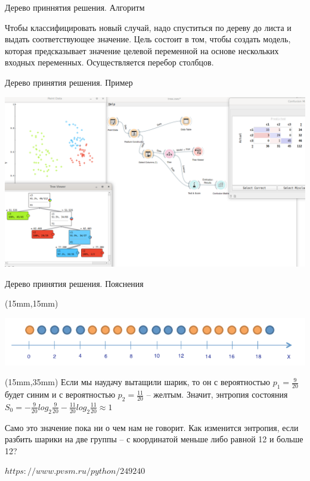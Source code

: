 \documentclass[10pt,pdf,hyperref={unicode}]{beamer}
\begin{document}
\begin{frame}{Дерево приннятия решения. Алгоритм}


Чтобы классифицировать новый случай, надо спуститься по дереву до листа и выдать соответствующее значение. 
Цель состоит в том, чтобы создать модель, которая предсказывает значение целевой 
переменной на основе нескольких входных переменных. Осуществляется перебор  столбцов.
\end{frame}

\begin{frame}{Дерево принятия решения. Пример}


\includegraphics[scale=0.2]{images/task08_01.png}

\end{frame}


\begin{frame}{Дерево принятия решения. Пояснения}


\begin{textblock*}{120mm}(15mm,15mm)
 

\includegraphics[scale=0.4]{images/ris_02.png}

\end{textblock*} 


\begin{textblock*}{90mm}(15mm,35mm)
Если мы наудачу вытащили шарик, 
то он с вероятностью $ p_1=\frac{9}{20} $ будет синим и с вероятностью $ p_2=\frac{11}{20} $ – желтым. 
Значит, энтропия состояния  $S_0=-\frac{9}{20}log_2{\frac{9}{20}}-\frac{11}{20}log_2{\frac{11}{20}} \approx 1$

Само это значение пока ни о чем нам не говорит. 
Как изменится энтропия, если разбить шарики на две группы – с координатой меньше либо равной 12 и больше 12?

$https://www.pvsm.ru/python/249240$
\end{textblock*} 



\end{frame}
\end{document}
